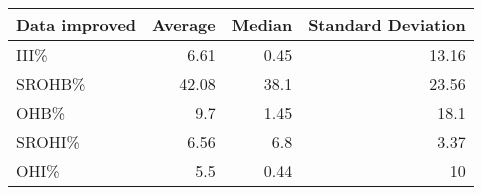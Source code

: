 \begin{tabular}{l|r|r|r}
\hline
 Data improved   &   Average &   Median &   Standard Deviation \\
\hline
 III\%            &      6.61 &     0.45 &                13.16 \\
 \hline
 SROHB\%          &     42.08 &    38.1  &                23.56 \\
 \hline
 OHB\%            &      9.7  &     1.45 &                18.1  \\
 \hline
 SROHI\%          &      6.56 &     6.8  &                 3.37 \\
 \hline
 OHI\%            &      5.5  &     0.44 &                10    \\
\hline
\end{tabular}
